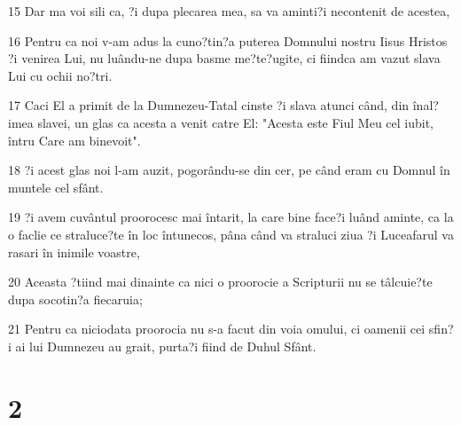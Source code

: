 \par 15 Dar ma voi sili ca, ?i dupa plecarea mea, sa va aminti?i necontenit de acestea,
\par 16 Pentru ca noi v-am adus la cuno?tin?a puterea Domnului nostru Iisus Hristos ?i venirea Lui, nu luându-ne dupa basme me?te?ugite, ci fiindca am vazut slava Lui cu ochii no?tri.
\par 17 Caci El a primit de la Dumnezeu-Tatal cinste ?i slava atunci când, din înal?imea slavei, un glas ca acesta a venit catre El: "Acesta este Fiul Meu cel iubit, întru Care am binevoit".
\par 18 ?i acest glas noi l-am auzit, pogorându-se din cer, pe când eram cu Domnul în muntele cel sfânt.
\par 19 ?i avem cuvântul proorocesc mai întarit, la care bine face?i luând aminte, ca la o faclie ce straluce?te în loc întunecos, pâna când va straluci ziua ?i Luceafarul va rasari în inimile voastre,
\par 20 Aceasta ?tiind mai dinainte ca nici o proorocie a Scripturii nu se tâlcuie?te dupa socotin?a fiecaruia;
\par 21 Pentru ca niciodata proorocia nu s-a facut din voia omului, ci oamenii cei sfin?i ai lui Dumnezeu au grait, purta?i fiind de Duhul Sfânt.

\chapter{2}

